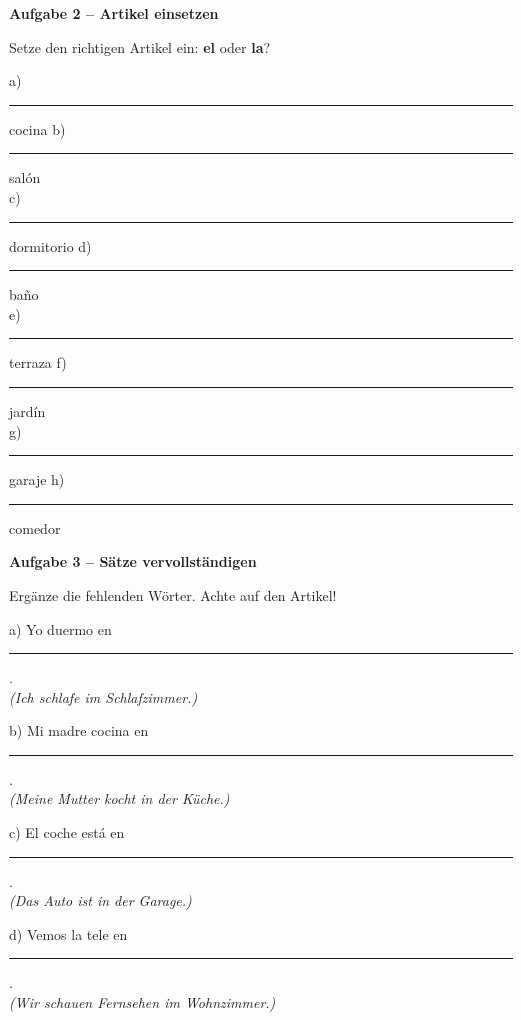 \documentclass[11pt, a4paper]{article}
\newcommand{\fachfarbe}{spanisch}
\newcommand{\punktebox}[1]{\hfill\fbox{\small \_/#1}}
\newcommand{\luecke}[1]{\rule{#1}{0.4pt}}
\newenvironment{aufgabe}[1]{%
    \needspace{5\baselineskip}%
    \nopagebreak[4]%
    \vspace{10pt}
    \noindent\textbf{\textcolor{\fachfarbe}{Aufgabe #1}}
    \nopagebreak[4]%
    \vspace{5pt}
    \nopagebreak[4]%
    \begin{list}{}{\leftmargin=0pt}
    \item[]
}{%
    \end{list}
}
\newcommand{\es}[1]{\textcolor{\fachfarbe}{\textbf{#1}}}
\begin{document}
\vspace{15pt}


\begin{aufgabe}{2 -- Artikel einsetzen}
Setze den richtigen Artikel ein: \es{el} oder \es{la}? \punktebox{8}
\end{aufgabe}

\noindent
a) \luecke{1.5cm} cocina \hfill
b) \luecke{1.5cm} salón \\[0.8em]
c) \luecke{1.5cm} dormitorio \hfill
d) \luecke{1.5cm} baño \\[0.8em]
e) \luecke{1.5cm} terraza \hfill
f) \luecke{1.5cm} jardín \\[0.8em]
g) \luecke{1.5cm} garaje \hfill
h) \luecke{1.5cm} comedor \\

\vspace{15pt}


\begin{aufgabe}{3 -- Sätze vervollständigen}
Ergänze die fehlenden Wörter. Achte auf den Artikel! \punktebox{10}
\end{aufgabe}

\noindent
a) Yo duermo en \luecke{4cm}. \\
\hspace*{0.5cm}\textit{(Ich schlafe im Schlafzimmer.)}

\vspace{0.8em}

\noindent
b) Mi madre cocina en \luecke{4cm}. \\
\hspace*{0.5cm}\textit{(Meine Mutter kocht in der Küche.)}

\vspace{0.8em}

\noindent
c) El coche está en \luecke{4cm}. \\
\hspace*{0.5cm}\textit{(Das Auto ist in der Garage.)}

\vspace{0.8em}

\noindent
d) Vemos la tele en \luecke{4cm}. \\
\hspace*{0.5cm}\textit{(Wir schauen Fernsehen im Wohnzimmer.)}
\end{document}
